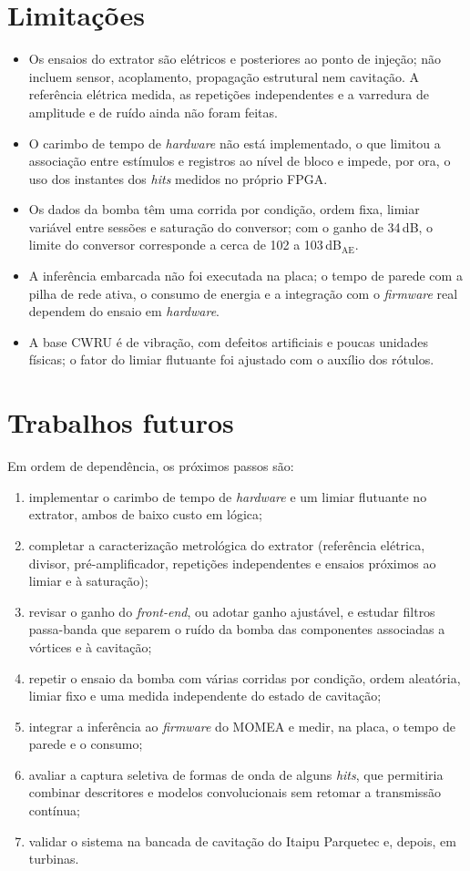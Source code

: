 \section{Limitações}

\begin{itemize}
	\item Os ensaios do extrator são elétricos e posteriores ao ponto de injeção; não incluem sensor, acoplamento, propagação estrutural nem cavitação. A referência elétrica medida, as repetições independentes e a varredura de amplitude e de ruído ainda não foram feitas.
	\item O carimbo de tempo de \textit{hardware} não está implementado, o que limitou a associação entre estímulos e registros ao nível de bloco e impede, por ora, o uso dos instantes dos \textit{hits} medidos no próprio FPGA.
	\item Os dados da bomba têm uma corrida por condição, ordem fixa, limiar variável entre sessões e saturação do conversor; com o ganho de 34\,dB, o limite do conversor corresponde a cerca de 102 a 103\,dB\(_{\mathrm{AE}}\).
	\item A inferência embarcada não foi executada na placa; o tempo de parede com a pilha de rede ativa, o consumo de energia e a integração com o \textit{firmware} real dependem do ensaio em \textit{hardware}.
	\item A base CWRU é de vibração, com defeitos artificiais e poucas unidades físicas; o fator do limiar flutuante foi ajustado com o auxílio dos rótulos.
\end{itemize}

\section{Trabalhos futuros}

Em ordem de dependência, os próximos passos são:
\begin{enumerate}[label=\textbf{\arabic*.}]
	\item implementar o carimbo de tempo de \textit{hardware} e um limiar flutuante no extrator, ambos de baixo custo em lógica;
	\item completar a caracterização metrológica do extrator (referência elétrica, divisor, pré-amplificador, repetições independentes e ensaios próximos ao limiar e à saturação);
	\item revisar o ganho do \textit{front-end}, ou adotar ganho ajustável, e estudar filtros passa-banda que separem o ruído da bomba das componentes associadas a vórtices e à cavitação;
	\item repetir o ensaio da bomba com várias corridas por condição, ordem aleatória, limiar fixo e uma medida independente do estado de cavitação;
	\item integrar a inferência ao \textit{firmware} do MOMEA e medir, na placa, o tempo de parede e o consumo;
	\item avaliar a captura seletiva de formas de onda de alguns \textit{hits}, que permitiria combinar descritores e modelos convolucionais sem retomar a transmissão contínua;
	\item validar o sistema na bancada de cavitação do Itaipu Parquetec e, depois, em turbinas.
\end{enumerate}
